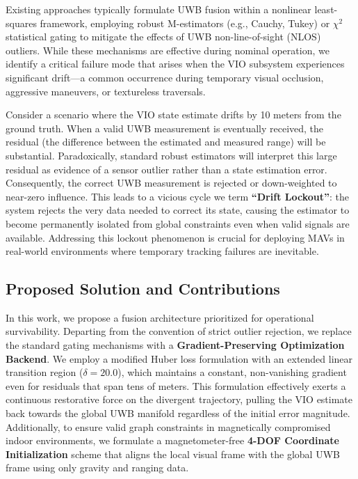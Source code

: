 \documentclass[conference]{IEEEtran}
\begin{document}
Existing approaches typically formulate UWB fusion within a nonlinear least-squares framework, employing robust M-estimators (e.g., Cauchy, Tukey) or $\chi^2$ statistical gating to mitigate the effects of UWB non-line-of-sight (NLOS) outliers. While these mechanisms are effective during nominal operation, we identify a critical failure mode that arises when the VIO subsystem experiences significant drift—a common occurrence during temporary visual occlusion, aggressive maneuvers, or textureless traversals.

Consider a scenario where the VIO state estimate drifts by 10 meters from the ground truth. When a valid UWB measurement is eventually received, the residual (the difference between the estimated and measured range) will be substantial. Paradoxically, standard robust estimators will interpret this large residual as evidence of a sensor outlier rather than a state estimation error. Consequently, the correct UWB measurement is rejected or down-weighted to near-zero influence. This leads to a vicious cycle we term \textbf{``Drift Lockout''}: the system rejects the very data needed to correct its state, causing the estimator to become permanently isolated from global constraints even when valid signals are available. Addressing this lockout phenomenon is crucial for deploying MAVs in real-world environments where temporary tracking failures are inevitable.

\subsection{Proposed Solution and Contributions}
In this work, we propose a fusion architecture prioritized for operational survivability. Departing from the convention of strict outlier rejection, we replace the standard gating mechanisms with a \textbf{Gradient-Preserving Optimization Backend}. We employ a modified Huber loss formulation with an extended linear transition region ($\delta=20.0$), which maintains a constant, non-vanishing gradient even for residuals that span tens of meters. This formulation effectively exerts a continuous restorative force on the divergent trajectory, pulling the VIO estimate back towards the global UWB manifold regardless of the initial error magnitude. Additionally, to ensure valid graph constraints in magnetically compromised indoor environments, we formulate a magnetometer-free \textbf{4-DOF Coordinate Initialization} scheme that aligns the local visual frame with the global UWB frame using only gravity and ranging data.
\end{document}
